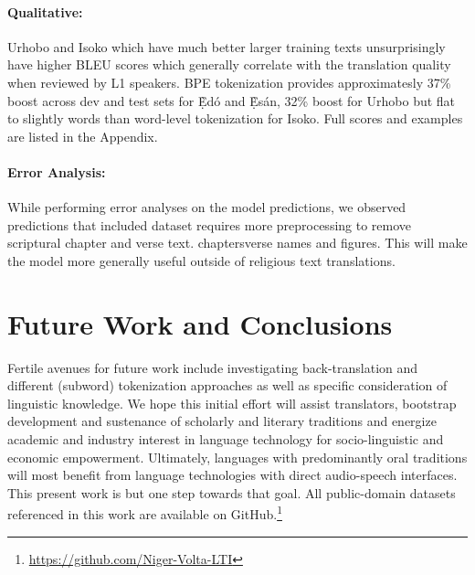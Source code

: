 \documentclass{article} %
\begin{document}
\paragraph{Qualitative:} Urhobo and Isoko which have much better larger training texts unsurprisingly have higher BLEU scores which generally correlate with the translation quality when reviewed by L1 speakers. BPE tokenization provides approximatesly 37\% boost across dev and test sets for \d{\`E}d{\'o} and \d{\`E}s{\'a}n, 32\% boost for Urhobo but flat to slightly words than word-level tokenization for Isoko. Full scores and examples are listed in the Appendix.

\paragraph{Error Analysis:} While performing error analyses on the model predictions, we observed predictions that included  dataset requires more preprocessing to remove scriptural chapter and verse text.  chapters\/verse names and figures. This will make the model more generally useful outside of religious text translations.

\section{Future Work and Conclusions}
Fertile avenues for future work include investigating back-translation and different (subword) tokenization approaches as well as specific consideration of linguistic knowledge. We hope this initial effort will assist translators, bootstrap development and sustenance of scholarly and literary traditions and energize academic and industry interest in language technology for socio-linguistic and economic empowerment. Ultimately, languages with predominantly oral traditions will most benefit from language technologies with direct audio-speech interfaces. This present work is but one step towards that goal. All public-domain datasets referenced in this work are available on GitHub.\footnote{\url{https://github.com/Niger-Volta-LTI}}
 
% 
\end{document}
